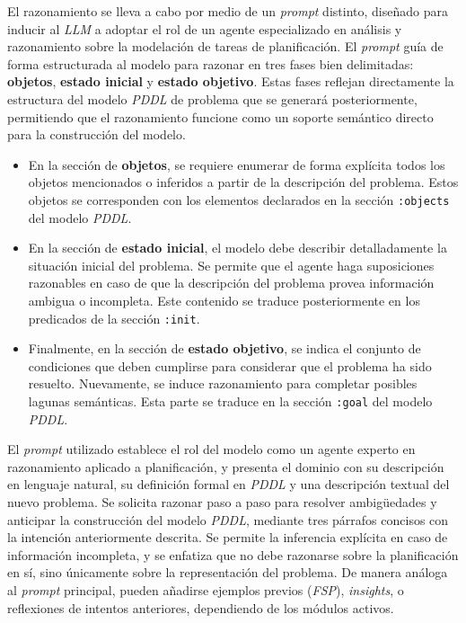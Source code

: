 El razonamiento se lleva a cabo por medio de un \textit{prompt} distinto, diseñado para inducir al \textit{LLM} a adoptar el rol de un agente especializado en análisis y razonamiento sobre la modelación de tareas de planificación. El \textit{prompt} guía de forma estructurada al modelo para razonar en tres fases bien delimitadas: \textbf{objetos}, \textbf{estado inicial} y \textbf{estado objetivo}. Estas fases reflejan directamente la estructura del modelo \textit{PDDL} de problema que se generará posteriormente, permitiendo que el razonamiento funcione como un soporte semántico directo para la construcción del modelo.

\begin{itemize}
    \item En la sección de \textbf{objetos}, se requiere enumerar de forma explícita todos los objetos mencionados o inferidos a partir de la descripción del problema. Estos objetos se corresponden con los elementos declarados en la sección \texttt{:objects} del modelo \textit{PDDL}.

    \item En la sección de \textbf{estado inicial}, el modelo debe describir detalladamente la situación inicial del problema. Se permite que el agente haga suposiciones razonables en caso de que la descripción del problema provea información ambigua o incompleta. Este contenido se traduce posteriormente en los predicados de la sección \texttt{:init}.

    \item Finalmente, en la sección de \textbf{estado objetivo}, se indica el conjunto de condiciones que deben cumplirse para considerar que el problema ha sido resuelto. Nuevamente, se induce razonamiento para completar posibles lagunas semánticas. Esta parte se traduce en la sección \texttt{:goal} del modelo \textit{PDDL}.
\end{itemize}

El \textit{prompt} utilizado establece el rol del modelo como un agente experto en razonamiento aplicado a planificación, y presenta el dominio con su descripción en lenguaje natural, su definición formal en \textit{PDDL} y una descripción textual del nuevo problema. Se solicita razonar paso a paso para resolver ambigüedades y anticipar la construcción del modelo \textit{PDDL}, mediante tres párrafos concisos con la intención anteriormente descrita. Se permite la inferencia explícita en caso de información incompleta, y se enfatiza que no debe razonarse sobre la planificación en sí, sino únicamente sobre la representación del problema. De manera análoga al \textit{prompt} principal, pueden añadirse ejemplos previos (\textit{FSP}), \textit{insights}, o reflexiones de intentos anteriores, dependiendo de los módulos activos.

